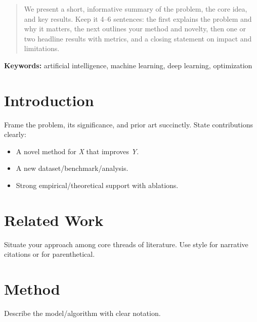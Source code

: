   
  \maketitle


  \begin{abstract}
    We present a short, informative summary of the problem, the core idea, and key results. Keep it 4--6 sentences: the first explains the problem and why it matters, the next outlines your method and novelty, then one or two headline results with metrics, and a closing statement on impact and limitations.
  \end{abstract}

  \vspace{0.25em}
  \noindent\textbf{Keywords:} artificial intelligence, machine learning, deep learning, optimization

  \section{Introduction}
  Frame the problem, its significance, and prior art succinctly. State contributions clearly:
  \begin{itemize}
  \item A novel method for \emph{X} that improves \emph{Y}.
  \item A new dataset/benchmark/analysis.
  \item Strong empirical/theoretical support with ablations.
  \end{itemize}

  \section{Related Work}
  Situate your approach among core threads of literature. Use \citet{lecun2015deep} style for narrative citations or \citep{kingma2014adam} for parenthetical.

  \section{Method}
  Describe the model/algorithm with clear notation.
